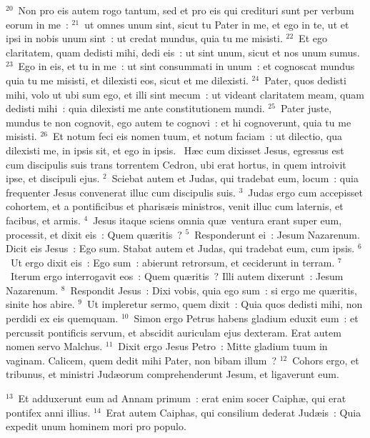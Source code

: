 ${}^{20}$~Non pro eis autem rogo tantum, sed et pro eis qui credituri sunt per verbum eorum in me~:
${}^{21}$~ut omnes unum sint, sicut tu Pater in me, et ego in te, ut et ipsi in nobis unum sint~: ut credat mundus, quia tu me misisti.
${}^{22}$~Et ego claritatem, quam dedisti mihi, dedi eis~: ut sint unum, sicut et nos unum sumus.
${}^{23}$~Ego in eis, et tu in me~: ut sint consummati in unum~: et cognoscat mundus quia tu me misisti, et dilexisti eos, sicut et me dilexisti.
${}^{24}$~Pater, quos dedisti mihi, volo ut ubi sum ego, et illi sint mecum~: ut videant claritatem meam, quam dedisti mihi~: quia dilexisti me ante constitutionem mundi.
${}^{25}$~Pater juste, mundus te non cognovit, ego autem te cognovi~: et hi cognoverunt, quia tu me misisti.
${}^{26}$~Et notum feci eis nomen tuum, et notum faciam~: ut dilectio, qua dilexisti me, in ipsis sit, et ego in ipsis.
~\lettrine[lines=10,image=true,loversize=0.05,lraise=-0.03]{H}{}\ae c cum dixisset Jesus, egressus est cum discipulis suis trans torrentem Cedron, ubi erat hortus, in quem introivit ipse, et discipuli ejus.
${}^{2}$~Sciebat autem et Judas, qui tradebat eum, locum~: quia frequenter Jesus convenerat illuc cum discipulis suis.
${}^{3}$~Judas ergo cum accepisset cohortem, et a pontificibus et pharis\ae is ministros, venit illuc cum laternis, et facibus, et armis.
${}^{4}$~Jesus itaque sciens omnia qu\ae\ ventura erant super eum, processit, et dixit eis~: Quem qu\ae ritis~?
${}^{5}$~Responderunt ei~: Jesum Nazarenum. Dicit eis Jesus~: Ego sum. Stabat autem et Judas, qui tradebat eum, cum ipsis.
${}^{6}$~Ut ergo dixit eis~: Ego sum~: abierunt retrorsum, et ceciderunt in terram.
${}^{7}$~Iterum ergo interrogavit eos~: Quem qu\ae ritis~? Illi autem dixerunt~: Jesum Nazarenum.
${}^{8}$~Respondit Jesus~: Dixi vobis, quia ego sum~: si ergo me qu\ae ritis, sinite hos abire.
${}^{9}$~Ut impleretur sermo, quem dixit~: Quia quos dedisti mihi, non perdidi ex eis quemquam.
${}^{10}$~Simon ergo Petrus habens gladium eduxit eum~: et percussit pontificis servum, et abscidit auriculam ejus dexteram. Erat autem nomen servo Malchus.
${}^{11}$~Dixit ergo Jesus Petro~: Mitte gladium tuum in vaginam. Calicem, quem dedit mihi Pater, non bibam illum~?
${}^{12}$~Cohors ergo, et tribunus, et ministri Jud\ae orum comprehenderunt Jesum, et ligaverunt eum.


${}^{13}$~Et adduxerunt eum ad Annam primum~: erat enim socer Caiph\ae , qui erat pontifex anni illius.
${}^{14}$~Erat autem Caiphas, qui consilium dederat Jud\ae is~: Quia expedit unum hominem mori pro populo.



